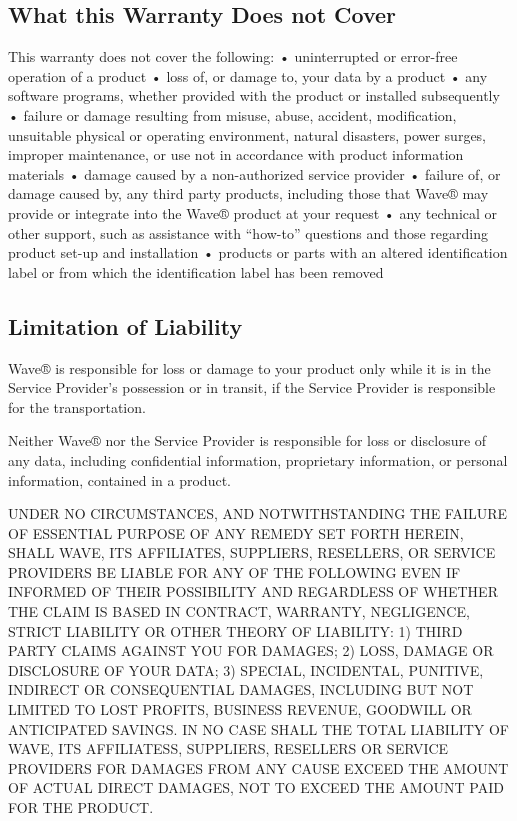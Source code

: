 \documentclass[letterpaper,10pt,openany,oneside,english]{sphinxmanual}
\begin{document}
\subsection{What this Warranty Does not Cover}
\label{\detokenize{part1:what-this-warranty-does-not-cover}}
This warranty does not cover the following:
• uninterrupted or error-free operation of a product
• loss of, or damage to, your data by a product
• any software programs, whether provided with the product or installed subsequently
• failure or damage resulting from misuse, abuse, accident, modification, unsuitable physical or operating environment, natural disasters, power surges, improper maintenance, or use not in accordance with product information materials
• damage caused by a non-authorized service provider
• failure of, or damage caused by, any third party products, including those that Wave® may provide or integrate into the Wave® product at your request
• any technical or other support, such as assistance with “how-to” questions and those regarding product set-up and installation
• products or parts with an altered identification label or from which the identification label has been removed


\subsection{Limitation of Liability}
\label{\detokenize{part1:limitation-of-liability}}
Wave® is responsible for loss or damage to your product only while it is in the Service Provider’s possession or in transit, if the Service Provider is responsible for the transportation.

Neither Wave® nor the Service Provider is responsible for loss or disclosure of any data, including confidential information, proprietary information, or personal information, contained in a product.

UNDER NO CIRCUMSTANCES, AND NOTWITHSTANDING THE FAILURE OF ESSENTIAL PURPOSE OF ANY REMEDY SET FORTH HEREIN, SHALL WAVE, ITS AFFILIATES, SUPPLIERS, RESELLERS, OR SERVICE PROVIDERS BE LIABLE FOR ANY OF THE FOLLOWING EVEN IF INFORMED OF THEIR POSSIBILITY AND REGARDLESS OF WHETHER THE CLAIM IS BASED IN CONTRACT, WARRANTY, NEGLIGENCE, STRICT LIABILITY OR OTHER THEORY OF LIABILITY: 1) THIRD PARTY CLAIMS AGAINST YOU FOR DAMAGES; 2) LOSS, DAMAGE OR DISCLOSURE OF YOUR DATA; 3) SPECIAL, INCIDENTAL, PUNITIVE, INDIRECT OR CONSEQUENTIAL DAMAGES, INCLUDING BUT NOT LIMITED TO LOST PROFITS, BUSINESS REVENUE, GOODWILL OR ANTICIPATED SAVINGS. IN NO CASE SHALL THE TOTAL LIABILITY OF WAVE, ITS AFFILIATESS, SUPPLIERS, RESELLERS OR SERVICE PROVIDERS FOR DAMAGES FROM ANY CAUSE EXCEED THE AMOUNT OF ACTUAL DIRECT DAMAGES, NOT TO EXCEED THE AMOUNT PAID FOR THE PRODUCT.
\end{document}
